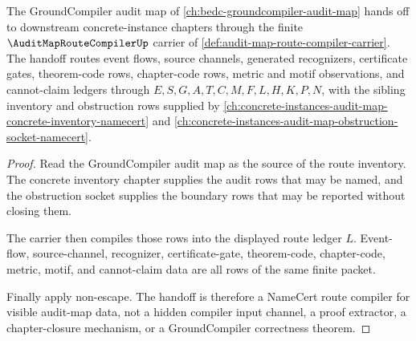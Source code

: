 \begin{theorem}
\label{thm:audit-map-route-compiler-groundcompiler-handoff}
The GroundCompiler audit map of \autoref{ch:bedc-groundcompiler-audit-map} hands off to downstream concrete-instance chapters through the finite $\AuditMapRouteCompilerUp$ carrier of \autoref{def:audit-map-route-compiler-carrier}. The handoff routes event flows, source channels, generated recognizers, certificate gates, theorem-code rows, chapter-code rows, metric and motif observations, and cannot-claim ledgers through $E,S,G,A,T,C,M,F,L,H,K,P,N$, with the sibling inventory and obstruction rows supplied by \autoref{ch:concrete-instances-audit-map-concrete-inventory-namecert} and \autoref{ch:concrete-instances-audit-map-obstruction-socket-namecert}.
\end{theorem}
\begin{proof}
Read the GroundCompiler audit map as the source of the route inventory. The concrete inventory chapter supplies the audit rows that may be named, and the obstruction socket supplies the boundary rows that may be reported without closing them.

The carrier then compiles those rows into the displayed route ledger $L$. Event-flow, source-channel, recognizer, certificate-gate, theorem-code, chapter-code, metric, motif, and cannot-claim data are all rows of the same finite packet.

Finally apply non-escape. The handoff is therefore a NameCert route compiler for visible audit-map data, not a hidden compiler input channel, a proof extractor, a chapter-closure mechanism, or a GroundCompiler correctness theorem.
\end{proof}

